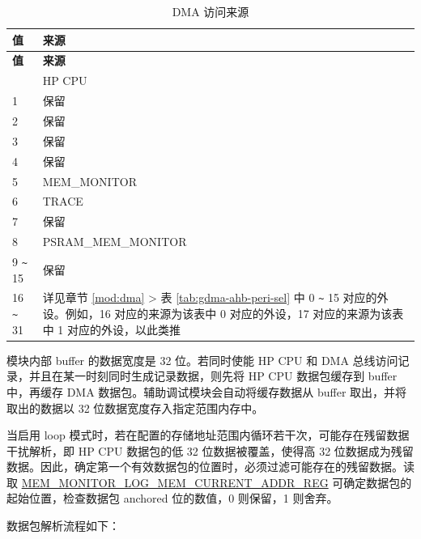 \documentclass[main\_\_CN.tex]{subfiles}
\begin{document}
\begin{longtable}{|l| m{8cm} |}
    \caption{DMA 访问来源}\label{tab:assistdbg-dma-source}
    \\\hline
    \rowcolor{lightgray}
    \textbf{值} & \textbf{来源} \\\hline
    \endfirsthead \hline \rowcolor{lightgray}
    \textbf{值} & \textbf{来源} \\\hline
    \endhead \endfoot \hline \endlastfoot
    0 & HP CPU \\\hline
    1 & 保留 \\\hline
    2 & 保留 \\\hline
    3 & 保留 \\\hline
    4 & 保留 \\\hline
    5 & MEM\_MONITOR \\\hline
    6 & TRACE \\\hline 
    7 & 保留 \\\hline
    8 & PSRAM\_MEM\_MONITOR \\\hline
    9 \verb+~+ 15 & 保留 \\\hline
    16 \verb+~+ 31 & 详见章节 \ref{mod:dma} \textit{\nameref{mod:dma}} > 表 \ref{tab:gdma-ahb-peri-sel} 中 0 \verb+~+ 15 对应的外设。例如，16 对应的来源为该表中 0 对应的外设，17 对应的来源为该表中 1 对应的外设，以此类推 \\\hline
\end{longtable}

模块内部 buffer 的数据宽度是 32 位。若同时使能 HP CPU 和 DMA 总线访问记录，并且在某一时刻同时生成记录数据，则先将 HP CPU 数据包缓存到 buffer 中，再缓存 DMA 数据包。辅助调试模块会自动将缓存数据从 buffer 取出，并将取出的数据以 32 位数据宽度存入指定范围内存中。

当启用 loop 模式时，若在配置的存储地址范围内循环若干次，可能存在残留数据干扰解析，即 HP CPU 数据包的低 32 位数据被覆盖，使得高 32 位数据成为残留数据。因此，确定第一个有效数据包的位置时，必须过滤可能存在的残留数据。读取 \hyperref[regdesc:MEMMONITORLOGMEMCURRENTADDRREG]{MEM\_MONITOR\_LOG\_MEM\_CURRENT\_ADDR\_REG} 可确定数据包的起始位置，检查数据包 anchored 位的数值，0 则保留，1 则舍弃。

数据包解析流程如下：
\end{document}
